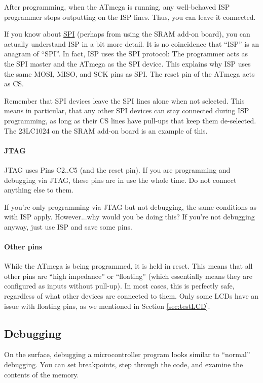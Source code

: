 \documentclass{article}
\newenvironment{note}{\begin{tcolorbox}[colback=blue!5!white,colframe=blue!75!black,title=\textbf{Note}]}{\end{tcolorbox}}
\begin{document}
After programming, when the ATmega is running, any well-behaved ISP programmer stops outputting on the ISP lines. Thus, you can leave it connected. 

\begin{note}
If you know about \href{https://en.wikipedia.org/wiki/Serial_Peripheral_Interface}{SPI} (perhaps from using the SRAM add-on board), you can actually understand ISP in a bit more detail. It is no coincidence that ``ISP'' is an anagram of ``SPI''. In fact, ISP uses the SPI protocol: The programmer acts as the SPI master and the ATmega as the SPI device. This explains why ISP uses the same MOSI, MISO, and SCK pins as SPI. The reset pin of the ATmega acts as CS. 

Remember that SPI devices leave the SPI lines alone when not selected. This means in particular, that any other SPI devices can stay connected during ISP programming, as long as their CS lines have pull-ups that keep them de-selected. The 23LC1024 on the SRAM add-on board is an example of this. 
\end{note}

\paragraph{JTAG} JTAG uses Pins C2..C5 (and the reset pin). If you are programming and debugging via JTAG, these pins are in use the whole time. Do not connect anything else to them. 

If you're only programming via JTAG but not debugging, the same conditions as with ISP apply. However...why would you be doing this? If you're not debugging anyway, just use ISP and save some pins. 

\paragraph{Other pins} While the ATmega is being programmed, it is held in reset. This means that all other pins are ``high impedance'' or ``floating'' (which essentially means they are configured as inputs without pull-up). In most cases, this is perfectly safe, regardless of what other devices are connected to them. Only some LCDs have an issue with floating pins, as we mentioned in Section \ref{sec:testLCD}. 

\subsection{Debugging}
On the surface, debugging a microcontroller program looks similar to ``normal'' debugging. You can set breakpoints, step through the code, and examine the contents of the memory. 
\end{document}
